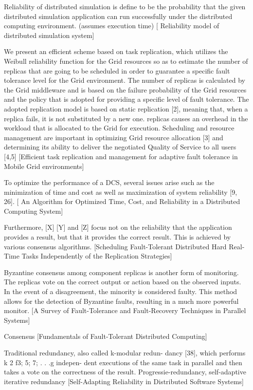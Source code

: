 \documentclass{cslthse-msc}
\begin{document}
Reliability of distributed simulation is define to be the probability that the given distributed simulation application can run successfully under the distributed computing environment. (assumes execution time) [ Reliability model of distributed simulation system]

We present an efficient scheme based on task replication, which utilizes the Weibull reliability function for the Grid resources so as to estimate the number of replicas that are going to be scheduled in order to guarantee a specific fault tolerance level for the Grid environment. The number of replicas is calculated by the Grid middleware and is based on the failure probability of the Grid resources and the policy that is adopted for providing a specific level of fault tolerance. The adopted replication model is based on static replication [2], meaning that, when a replica fails, it is not substituted by a new one. replicas causes an overhead in the workload that is allocated to the Grid for execution. Scheduling and resource management are important in optimizing Grid resource allocation [3] and determining its ability to deliver the negotiated Quality of Service to all users [4,5] [Efficient task replication and management for adaptive fault tolerance in Mobile Grid environments]

To optimize the performance of a DCS, several issues arise such as the minimization of time and cost as well as maximization of system reliability [9, 26]. [	An Algorithm for Optimized Time, Cost, and Reliability in a Distributed Computing
System]


Furthermore, [X] [Y] and [Z] focus not on the reliability that the application provides a result, but that it provides the correct result. This is achieved by various consensus algorithms. [Scheduling Fault-Tolerant Distributed Hard Real-Time Tasks Independently of the Replication Strategies]

Byzantine consensus among component replicas is another form of monitoring. The replicas vote on the correct output or action based on the observed inputs. In the event of a disagreement, the minority is considered faulty. This method allows for the detection of Byzantine faults, resulting in a much more
powerful monitor.  [A Survey of Fault-Tolerance and Fault-Recovery Techniques in Parallel Systems]

Consensus [Fundamentals of Fault-Tolerant Distributed Computing]

Traditional redundancy, also called k-modular redun- dancy [38], which performs k 2 f3; 5; 7; . . .g indepen- dent executions of the same task in parallel and then takes a vote on the correctness of the result. 
Progressie-redundancy, self-adaptive iterative redundancy [Self-Adapting Reliability in Distributed Software Systems]
\end{document}
